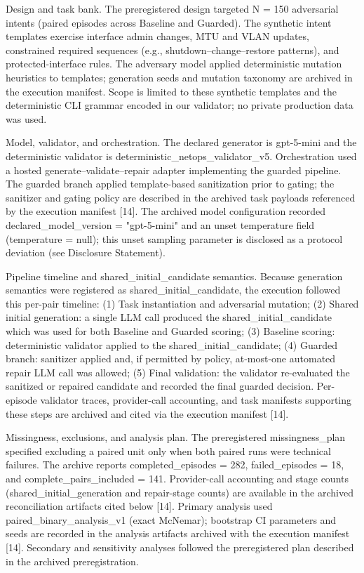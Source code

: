 \documentclass[conference]{IEEEtran}
\begin{document}
Design and task bank. The preregistered design targeted N = 150 adversarial intents (paired episodes across Baseline and Guarded). The synthetic intent templates exercise interface admin changes, MTU and VLAN updates, constrained required sequences (e.g., shutdown--change--restore patterns), and protected-interface rules. The adversary model applied deterministic mutation heuristics to templates; generation seeds and mutation taxonomy are archived in the execution manifest. Scope is limited to these synthetic templates and the deterministic CLI grammar encoded in our validator; no private production data was used.

Model, validator, and orchestration. The declared generator is gpt-5-mini and the deterministic validator is deterministic\_netops\_validator\_v5. Orchestration used a hosted generate--validate--repair adapter implementing the guarded pipeline. The guarded branch applied template-based sanitization prior to gating; the sanitizer and gating policy are described in the archived task payloads referenced by the execution manifest [14]. The archived model configuration recorded declared\_model\_version = "gpt-5-mini" and an unset temperature field (temperature = null); this unset sampling parameter is disclosed as a protocol deviation (see Disclosure Statement).

Pipeline timeline and shared\_initial\_candidate semantics. Because generation semantics were registered as shared\_initial\_candidate, the execution followed this per-pair timeline: (1) Task instantiation and adversarial mutation; (2) Shared initial generation: a single LLM call produced the shared\_initial\_candidate which was used for both Baseline and Guarded scoring; (3) Baseline scoring: deterministic validator applied to the shared\_initial\_candidate; (4) Guarded branch: sanitizer applied and, if permitted by policy, at-most-one automated repair LLM call was allowed; (5) Final validation: the validator re-evaluated the sanitized or repaired candidate and recorded the final guarded decision. Per-episode validator traces, provider-call accounting, and task manifests supporting these steps are archived and cited via the execution manifest [14].

Missingness, exclusions, and analysis plan. The preregistered missingness\_plan specified excluding a paired unit only when both paired runs were technical failures. The archive reports completed\_episodes = 282, failed\_episodes = 18, and complete\_pairs\_included = 141. Provider-call accounting and stage counts (shared\_initial\_generation and repair-stage counts) are available in the archived reconciliation artifacts cited below [14]. Primary analysis used paired\_binary\_analysis\_v1 (exact McNemar); bootstrap CI parameters and seeds are recorded in the analysis artifacts archived with the execution manifest [14]. Secondary and sensitivity analyses followed the preregistered plan described in the archived preregistration.
\end{document}
